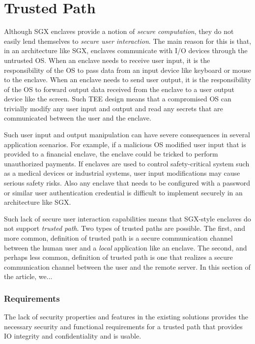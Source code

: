 \section*{Trusted Path}

Although SGX enclaves provide a notion of \emph{secure computation}, they do not easily lend themselves to \emph{secure user interaction}. The main reason for this is that, in an architecture like SGX, enclaves communicate with I/O devices through the untrusted OS. When an enclave needs to receive user input, it is the responsibility of the OS to pass data from an input device like keyboard or mouse to the enclave. When an enclave needs to send user output, it is the responsibility of the OS to forward output data received from the enclave to a user output device like the screen. Such TEE design means that a compromised OS can trivially modify any user input and output and read any secrets that are communicated between the user and the enclave. 

Such user input and output manipulation can have severe consequences in several application scenarios. For example, if a malicious OS modified user input that is provided to a financial enclave, the enclave could be tricked to perform unauthorized payments. If enclaves are used to control safety-critical system such as a medical devices or industrial systems, user input modifications may cause serious safety risks. Also any enclave that needs to be configured with a password or similar user authentication credential is difficult to implement securely in an architecture like SGX.

Such lack of secure user interaction capabilities means that SGX-style enclaves do not support \emph{trusted path}. Two types of trusted paths are possible. The first, and more common, definition of trusted path is a secure communication channel between the human user and a \emph{local} application like an enclave. The second, and perhaps less common, definition of trusted path is one that realizes a secure communication channel between the user and the remote server. In this section of the article, we... 


\subsubsection*{Requirements}
\label{goals}

The lack of security properties and features in the existing solutions provides the necessary security and functional requirements for a trusted path that provides IO integrity and confidentiality and is usable. 

